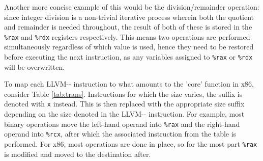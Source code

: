 \documentclass{article}
\begin{document}
Another more concise example of this would be the division/remainder operation: since integer division is a non-trivial iterative process wherein both the quotient and remainder is needed throughout, the result of both of these is stored in the \texttt{\%rax} and \texttt{\%rdx} registers respectively. This means two operations are performed simultaneously regardless of which value is used, hence they need to be restored before executing the next instruction, as any variables assigned to \lstinline!%rax! or \lstinline!%rdx! will be overwritten.

To map each LLVM-{}- instruction to what amounts to the 'core' function in x86, consider Table \ref{tab:trans}. Instructions for which the size varies, the suffix is denoted with \texttt{x} instead. This is then replaced with the appropriate size suffix depending on the size denoted in the LLVM-{}- instruction. For example, most binary operations move the left-hand operand into \texttt{\%rax} and the right-hand operand into  \texttt{\%rcx}, after which the associated instruction from the table is performed. For x86, most operations are done in place, so for the most part \texttt{\%rax} is modified and moved to the destination after.
\end{document}
